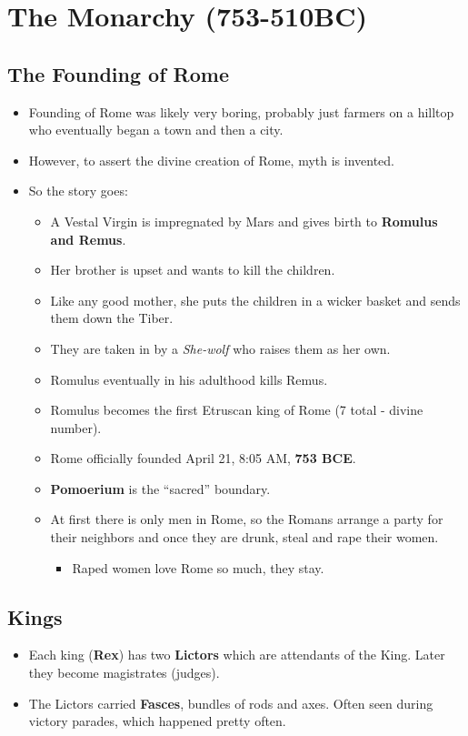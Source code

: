 \documentclass[12pt, twoside]{article}
\begin{document}
\section{The Monarchy (753-510BC)}
\subsection{The Founding of Rome}

\begin{itemize}
\item Founding of Rome was likely very boring, probably just farmers on a hilltop who eventually began a town and then a city.
\item However, to assert the divine creation of Rome, myth is invented.
\item So the story goes:
	\begin{itemize}
	\item A Vestal Virgin is impregnated by Mars and gives birth to \textbf{Romulus and Remus}.
	\item Her brother is upset and wants to kill the children.
	\item Like any good mother, she puts the children in a wicker basket and sends them down the Tiber.
	\item They are taken in by a \emph{She-wolf} who raises them as her own.
	\item Romulus eventually in his adulthood kills Remus.
	\item Romulus becomes the first Etruscan king of Rome (7 total - divine number).
	\item Rome officially founded April 21, 8:05 AM, \textbf{753 BCE}.
	\item \textbf{Pomoerium} is the ``sacred'' boundary.
	\item At first there is only men in Rome, so the Romans arrange a party for their neighbors and once they are drunk, steal and rape their women.
		\begin{itemize} \item Raped women love Rome so much, they stay. \end{itemize}
	\end{itemize}
\end{itemize}

\subsection{Kings}
\begin{itemize}
\item Each king (\textbf{Rex}) has two \textbf{Lictors} which are attendants of the King.  Later they become magistrates (judges).
\item The Lictors carried \textbf{Fasces}, bundles of rods and axes.  Often seen during victory parades, which happened pretty often.
\end{itemize}
\end{document}
